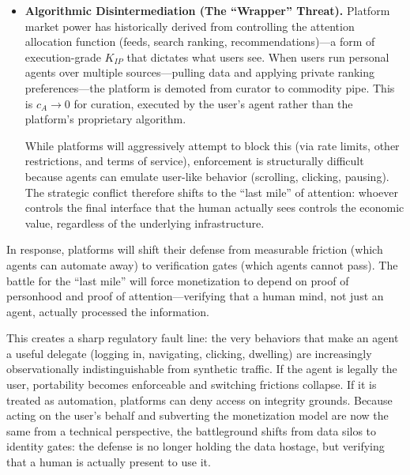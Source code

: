 \documentclass[12pt, letter]{article}
\begin{document}
\begin{itemize}
    However, agents reduce part of this coordination barrier by making multi-homing simpler. Instead of a binary choice (stay or switch), agents enable simultaneous presence: they can cross-post content, aggregate messages from multiple networks, and bridge interactions seamlessly. Users no longer need to coordinate a migration: they can add new networks without abandoning old ones, turning the social graph from a walled garden into a federated layer mediated by their own AI.

    \item \textbf{Algorithmic Disintermediation (The ``Wrapper'' Threat).} Platform market power has historically derived from controlling the attention allocation function (feeds, search ranking, recommendations)—a form of execution-grade $K_{IP}$ that dictates what users see. When users run personal agents over multiple sources—pulling data and applying private ranking preferences—the platform is demoted from curator to commodity pipe. This is $c_A \to 0$ for curation, executed by the user's agent rather than the platform's proprietary algorithm.

    While platforms will aggressively attempt to block this (via rate limits, other restrictions, and terms of service), enforcement is structurally difficult because agents can emulate user-like behavior (scrolling, clicking, pausing). The strategic conflict therefore shifts to the ``last mile'' of attention: whoever controls the final interface that the human actually sees controls the economic value, regardless of the underlying infrastructure.


\end{itemize}

In response, platforms will shift their defense from measurable friction (which agents can automate away) to verification gates (which agents cannot pass). The battle for the ``last mile'' will force monetization to depend on proof of personhood and proof of attention—verifying that a human mind, not just an agent, actually processed the information.

This creates a sharp regulatory fault line: the very behaviors that make an agent a useful delegate (logging in, navigating, clicking, dwelling) are increasingly observationally indistinguishable from synthetic traffic. If the agent is legally the user, portability becomes enforceable and switching frictions collapse. If it is treated as automation, platforms can deny access on integrity grounds. Because acting on the user's behalf and subverting the monetization model are now the same from a technical perspective, the battleground shifts from data silos to identity gates: the defense is no longer holding the data hostage, but verifying that a human is actually present to use it.
\end{document}
